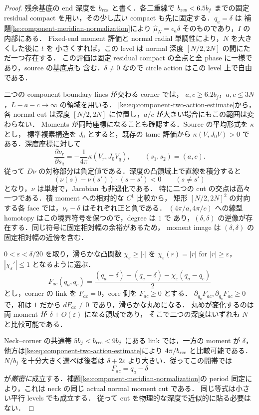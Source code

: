 \begin{proof}
残余基底の end 深度を $b_{\rm res}$ と書く．各二重線で
$b_{\rm res}<6.5b_j$ までの固定 residual compact を用い，その少し広い compact
も先に固定する．$q_a=\delta$ は
補題\ref{ke:component-meridian-normalization}により
$\widehat\mu_N=\epsilon_a\delta$ そのものであり，$I$ の内部にある．
Fixed-end moment 評価と normal radial 単調性により，$N$ を大きくした後に $t$ を
小さくすれば，この level は normal 深度 $[N/2,2N]$ の間にただ一つ存在する．
この評価は固定 residual compact の全点と全 phase に一様であり，source の基底点も
含む．$\delta\ne0$ なので circle action はこの level 上で自由である．

二つの component boundary lines が交わる corner では，
$a,c\ge6.2b_j$，$a,c\le3N$，$L-a-c\to\infty$ の領域を用いる．
\eqref{ke:eq:component-two-action-estimate}から，各 normal cut は深度
$[N/2,2N]$ に位置し，$a/c$ が大きい場合にもこの範囲は変わらない．
Moments が同時座標になることも確認する．Source の平均形式を $\kappa$ とし，
標準複素構造を $J_0$ とすると，既存の tame 評価から
$\kappa(V,J_0V)>0$ である．深度座標に対して
\[
 \frac{\partial\nu_r}{\partial s_q}
 =-\frac1{4\pi}\kappa(V_r,J_0V_q),\qquad (s_1,s_2)=(a,c).
\]
従って $D\nu$ の対称部分は負定値である．深度の凸領域上で直線を積分すると
\[
 (\nu(s)-\nu(s'))\cdot(s-s')<0\qquad(s\ne s')
\]
となり，$\nu$ は単射で，Jacobian も非退化である．
特に二つの cut の交点は高々一つである．積 moment への相対的な $C^1$ 比較から，
矩形 $[N/2,2N]^2$ の対向する各 face では，$\nu_r-\delta$ はそれぞれ正と負である．
$(4\pi/a,4\pi/c)$ への線型 homotopy はこの境界符号を保つので，degree は $1$ で
あり，$(\delta,\delta)$ の逆像が存在する．同じ符号に固定相対幅の余裕があるため，
moment image は $(\delta,\delta)$ の固定相対幅の近傍を含む．

$0<\varepsilon<\delta/20$ を取り，滑らかな凸関数
$\chi_\varepsilon\ge|\cdot|$ を
$\chi_\varepsilon(r)=|r|$ for $|r|\ge\varepsilon$，
$|\chi_\varepsilon'|\le1$ となるように選ぶ．
\[
 F_{ac}(q_a,q_c)
 =\frac{(q_a-\delta)+(q_c-\delta)
       -\chi_\varepsilon(q_a-q_c)}2
\]
とし，corner の link を $F_{ac}=0$，core 側を $F_{ac}\ge0$ とする．
$\partial_{q_a}F_{ac},\partial_{q_c}F_{ac}\ge0$ で，和は $1$ だから
$dF_{ac}\ne0$ であり，滑らかな丸めになる．
丸めが変化するのは両 moment が $\delta+O(\varepsilon)$ になる領域であり，
そこで二つの深度はいずれも $N$ と比較可能である．

Neck--corner の共通帯 $5b_j<b_{\rm res}<9b_j$ にある link では，一方の
moment が $\delta$，他方は\eqref{ke:eq:component-two-action-estimate}により
$4\pi/b_{\rm res}$ と比較可能である．$N/b_j$ を十分大きく選べば後者は
$\delta+2\varepsilon$ より大きい．従ってこの開帯では
\[
 F_{ac}=q_a-\delta
\]
が\emph{厳密に}成立する．補題\ref{ke:component-meridian-normalization}の
period 同定により，これは neck の同じ actual normal moment cut である．
同じ等式は小さい平行 levels でも成立する．
従って cut を物理的な深度で近似的に貼る必要はない．


\end{proof}
